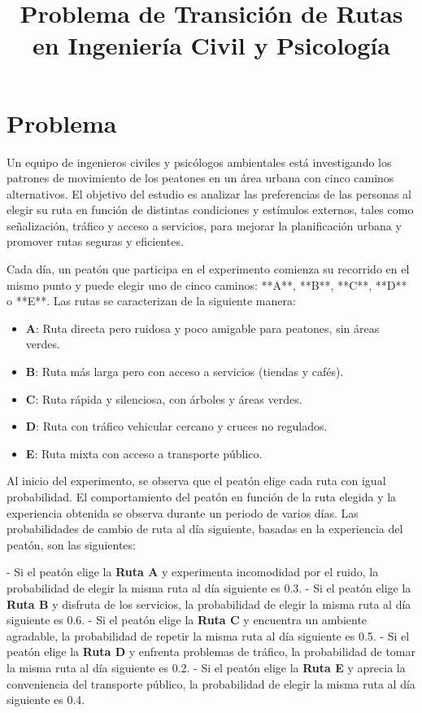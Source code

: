 \documentclass{article}
\begin{document}
\title{Problema de Transición de Rutas en Ingeniería Civil y Psicología}
\author{}
\date{}
\maketitle

\section*{Problema}

Un equipo de ingenieros civiles y psicólogos ambientales está investigando los patrones de movimiento de los peatones en un área urbana con cinco caminos alternativos. El objetivo del estudio es analizar las preferencias de las personas al elegir su ruta en función de distintas condiciones y estímulos externos, tales como señalización, tráfico y acceso a servicios, para mejorar la planificación urbana y promover rutas seguras y eficientes.

Cada día, un peatón que participa en el experimento comienza su recorrido en el mismo punto y puede elegir uno de cinco caminos: **A**, **B**, **C**, **D** o **E**. Las rutas se caracterizan de la siguiente manera:

\begin{itemize}
    \item \textbf{A}: Ruta directa pero ruidosa y poco amigable para peatones, sin áreas verdes.
    \item \textbf{B}: Ruta más larga pero con acceso a servicios (tiendas y cafés).
    \item \textbf{C}: Ruta rápida y silenciosa, con árboles y áreas verdes.
    \item \textbf{D}: Ruta con tráfico vehicular cercano y cruces no regulados.
    \item \textbf{E}: Ruta mixta con acceso a transporte público.
\end{itemize}

Al inicio del experimento, se observa que el peatón elige cada ruta con igual probabilidad. El comportamiento del peatón en función de la ruta elegida y la experiencia obtenida se observa durante un periodo de varios días. Las probabilidades de cambio de ruta al día siguiente, basadas en la experiencia del peatón, son las siguientes:

- Si el peatón elige la \textbf{Ruta A} y experimenta incomodidad por el ruido, la probabilidad de elegir la misma ruta al día siguiente es 0.3.
- Si el peatón elige la \textbf{Ruta B} y disfruta de los servicios, la probabilidad de elegir la misma ruta al día siguiente es 0.6.
- Si el peatón elige la \textbf{Ruta C} y encuentra un ambiente agradable, la probabilidad de repetir la misma ruta al día siguiente es 0.5.
- Si el peatón elige la \textbf{Ruta D} y enfrenta problemas de tráfico, la probabilidad de tomar la misma ruta al día siguiente es 0.2.
- Si el peatón elige la \textbf{Ruta E} y aprecia la conveniencia del transporte público, la probabilidad de elegir la misma ruta al día siguiente es 0.4.
\end{document}
